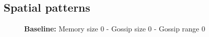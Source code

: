 \documentclass[english]{article}
\begin{document}
\subsection{Spatial patterns}

\begin{figure}[!hb]
  \centering
  \textbf{Baseline:} Memory size 0 - Gossip size 0 - Gossip range 0
\end{figure}
\end{document}
